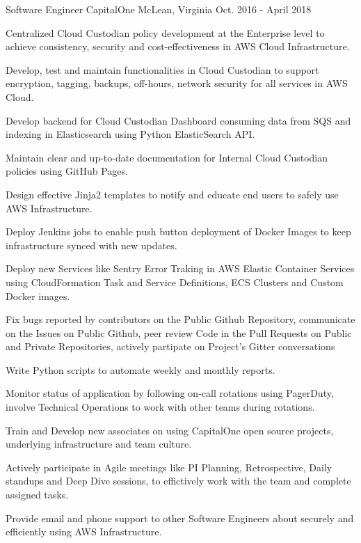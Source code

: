 \begin{cventries}

  \cventry
    {Software Engineer} %
    {CapitalOne} %
    {McLean, Virginia} %
    {Oct. 2016 - April 2018} %
    {
      \begin{cvitems} %
        \item {Centralized Cloud Custodian policy development at the Enterprise level to achieve consistency, security and cost-effectiveness in AWS Cloud Infrastructure.}
        \item {Develop, test and maintain functionalities in Cloud Custodian to support encryption, tagging, backups, off-hours, network security for all services in AWS Cloud.}
        \item {Develop backend for Cloud Custodian Dashboard consuming data from SQS and indexing in Elasticsearch using Python ElasticSearch API.}
        \item {Maintain clear and up-to-date documentation for Internal Cloud Custodian policies using GitHub Pages.}
        \item {Design effective Jinja2 templates to notify and educate end users to safely use AWS Infrastructure.}
        \item {Deploy Jenkins jobs to enable push button deployment of Docker Images to keep infrastructure synced with new updates.}
        \item {Deploy new Services like Sentry Error Traking in AWS Elastic Container Services using CloudFormation Task and Service Definitions, ECS Clusters and Custom Docker images.}
        \item {Fix bugs reported by contributors on the Public Github Repository, communicate on the Issues on Public Github, peer review Code in the Pull Requests on Public and Private Repositories, actively partipate on Project's Gitter conversations}
        \item {Write Python scripts to automate weekly and monthly reports.}
        \item {Monitor status of application by following on-call rotations using PagerDuty, involve Technical Operations to work with other teams during rotations.}
        \item {Train and Develop new associates on using CapitalOne open source projects, underlying infrastructure and team culture.}
        \item {Actively participate in Agile meetings like PI Planning, Retrospective, Daily standups and Deep Dive sessions, to effictively work with the team and complete assigned tasks.}
        \item {Provide email and phone support to other Software Engineers about securely and efficiently using AWS Infrastructure.}
      \end{cvitems}
    }


\end{cventries}
